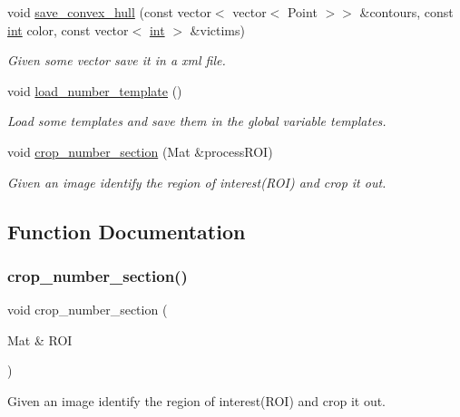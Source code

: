 \begin{DoxyCompactItemize}
void \mbox{\hyperlink{detection_8hh_a923b178671e2272c6b082335d118716a}{save\+\_\+convex\+\_\+hull}} (const vector$<$ vector$<$ Point $>$$>$ \&contours, const \mbox{\hyperlink{draw_8hh_aa620a13339ac3a1177c86edc549fda9b}{int}} color, const vector$<$ \mbox{\hyperlink{draw_8hh_aa620a13339ac3a1177c86edc549fda9b}{int}} $>$ \&victims)
\begin{DoxyCompactList}\small\item\em Given some vector save it in a xml file. \end{DoxyCompactList}\item 
void \mbox{\hyperlink{detection_8hh_a50993b0aa4f01d89a4e5d0aef4e1e5f4}{load\+\_\+number\+\_\+template}} ()
\begin{DoxyCompactList}\small\item\em Load some templates and save them in the global variable \textquotesingle{}templates\textquotesingle{}. \end{DoxyCompactList}\item 
void \mbox{\hyperlink{detection_8hh_a8edaf0da54add7cd1461bafecef26b56}{crop\+\_\+number\+\_\+section}} (Mat \&process\+R\+OI)
\begin{DoxyCompactList}\small\item\em Given an image identify the region of interest(\+R\+O\+I) and crop it out. \end{DoxyCompactList}\end{DoxyCompactItemize}


\subsection{Function Documentation}
\mbox{\label{detection_8hh_a8edaf0da54add7cd1461bafecef26b56}} 
\subsubsection{\texorpdfstring{crop\_number\_section()}{crop\_number\_section()}}
{\footnotesize\ttfamily void crop\+\_\+number\+\_\+section (\begin{DoxyParamCaption}\item[{Mat \&}]{R\+OI }\end{DoxyParamCaption})}



Given an image identify the region of interest(\+R\+O\+I) and crop it out. 


